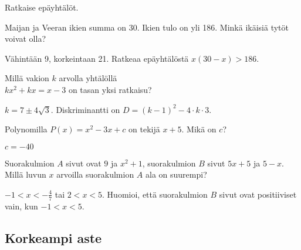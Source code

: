 \begin{tehtavasivu}
\begin{tehtava} 
Ratkaise epäyhtälöt.
		\begin{alakohdat}
		\end{alakohdat}
    \begin{vastaus}
		\begin{alakohdat}
		\alakohta{$ -2 < x < 3 $}
		\alakohta{$x \leq 0$ tai $x \geq 5$}
	\end{alakohdat}
    \end{vastaus}
\end{tehtava}

\begin{tehtava} 
Maijan ja Veeran ikien summa on 30. Ikien tulo on yli 186. Minkä ikäisiä tytöt voivat olla?
    \begin{vastaus}
	Vähintään 9, korkeintaan 21. Ratkeaa epäyhtälöstä $x(30-x)>186$.
	\end{vastaus}
\end{tehtava}

\begin{tehtava} 
Millä vakion $k$ arvolla yhtälöllä \\ $kx^2+kx=x-3$ on tasan yksi ratkaisu?
    \begin{vastaus}
		$k = 7 \pm 4 \sqrt{3}$. Diskriminantti on $D = (k-1)^2-4\cdot k \cdot 3$.
    \end{vastaus}
\end{tehtava}

\begin{tehtava} 
Polynomilla $P(x)=x^2-3x+c$ on tekijä $x+5$. Mikä on $c$?
    \begin{vastaus}
		$c=-40$
    \end{vastaus}
\end{tehtava}

\begin{tehtava} 
Suorakulmion $A$ sivut ovat $9$ ja $x^2+1$, suorakulmion $B$ sivut $5x+5$
ja $5-x$. Millä luvun $x$ arvoilla suorakulmion $A$ ala on suurempi?
    \begin{vastaus}
	$-1 < x < -\frac{4}{7}$ tai $2 < x < 5$. Huomioi, että suorakulmion $B$
    sivut ovat positiiviset vain, kun $-1<x<5$.
    \end{vastaus}
\end{tehtava}

\subsection*{Korkeampi aste}


\end{tehtavasivu}
